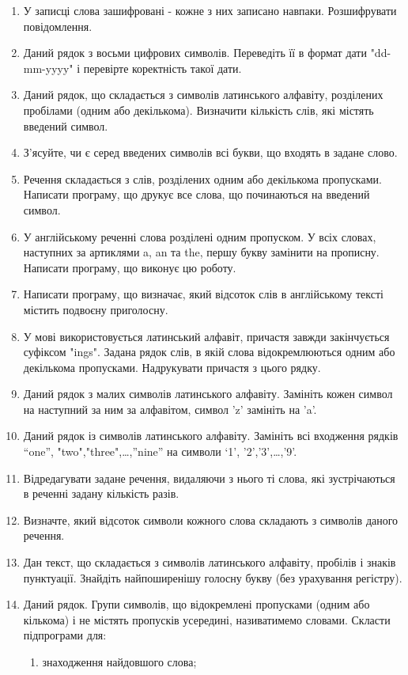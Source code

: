 \documentclass[]{article}
\makeatletter
\newcommand{\xslalph}[1]{\expandafter\@xslalph\csname c@#1\endcsname}
\newcommand{\@xslalph}[1]{%
    \ifcase#1\or а\or б\or в\or г\or д\or e\or є\or ж\or з\or i%
    \or й\or к\or л\or м\or н\or о\or п\or р\or с\or т%
    \or у\or ф\or х\or ц\or ч\or ш\or ю\or я\or аа\or бб\or вв %
    \else\@ctrerr\fi%
}
\makeatother
\begin{document}
\begin{enumerate}
\item
У записці слова зашифровані -
кожне з них записано навпаки. Розшифрувати повідомлення.
\item
Даний рядок з восьми цифрових символів. Переведіть її в формат дати
"dd-mm-yyyy" і перевірте коректність такої дати.
\item
Даний рядок, що складається з символів латинського алфавіту, розділених
пробілами (одним або декількома). Визначити кількість слів, які містять
введений символ.
\item
З'ясуйте, чи є серед введених символів всі букви, що входять в задане
слово.
\item
Речення складається з слів, розділених одним або декількома пропусками.
Написати програму, що друкує все слова, що починаються на введений
символ.
\item
У англійському реченні слова розділені одним пропуском. У всіх словах,
наступних за артиклями a, an та the, першу букву замінити на прописну.
Написати програму, що виконує цю роботу.
\item
Написати програму, що визначає, який відсоток слів в англійському тексті
містить подвоєну приголосну.
\item
У мові використовується латинський алфавіт, причастя завжди закінчується
суфіксом "ings". Задана рядок слів, в якій слова відокремлюються одним
або декількома пропусками. Надрукувати причастя з цього рядку.
\item
Даний рядок з малих символів латинського алфавіту. Замініть кожен символ
на наступний за ним за алфавітом, символ 'z' замініть на 'a'.
\item
Даний рядок із символів латинського алфавіту. Замініть всі входження
рядків ``one'', "two","three",\ldots{},''nine'' на символи `1',
'2','3',\ldots{},'9'.
\item
Відредагувати задане речення, видаляючи з нього ті слова, які
зустрічаються в реченні задану кількість разів.
\item
Визначте, який відсоток символи кожного слова складають з символів
даного речення.
\item
Дан текст, що складається з символів латинського алфавіту, пробілів і
знаків пунктуації. Знайдіть найпоширенішу голосну букву (без урахування
регістру).
\item
Даний рядок. Групи символів, що відокремлені пропусками (одним або
кількома) і не містять пропусків усередині, називатимемо словами.
Скласти підпрограми для:
\begin{enumerate}[label=\xslalph*)]
\item
 знаходження найдовшого слова;


\end{enumerate}
\end{enumerate}
\end{document}
